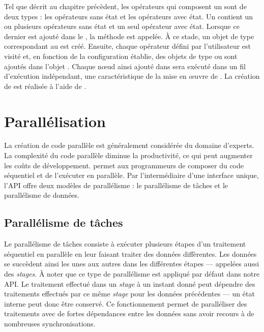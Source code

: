 Tel que d\'ecrit au chapitre pr\'ec\`edent, les op\'erateurs qui composent un  sont de deux types : les op\'erateurs sans \'etat et les op\'erateurs avec \'etat. Un  contient un ou plusieurs op\'erateurs sans \'etat et un seul op\'erateur avec \'etat. Lorsque ce dernier est ajout\'e dans le , la m\'ethode  est appel\'ee. \`A ce stade, un objet de type  correspondant au  est cr\'e\'e. Ensuite, chaque op\'erateur d\'efini par l'utilisateur est visit\'e et, en fonction de la configuration \'etablie, des objets de type  ou  sont ajout\'es dans l'objet . Chaque nœud ainsi ajout\'e dans  sera ex\'ecut\'e dans un fil d'ex\'ecution ind\'ependant, une caract\'eristique de la mise en \oe{}uvre de .
La cr\'eation de  est r\'ealis\'ee \`a l'aide de .


\section{Parall\'elisation}

La cr\'eation de code parall\`ele est g\'en\'eralement consid\'er\'ee du domaine d'experts. La complexit\'e du code parall\`ele diminue la productivit\'e, ce qui peut augmenter les co\^uts de d\'eveloppement.  permet aux programmeurs de composer du code s\'equentiel et de l'ex\'ecuter en parall\`ele. Par l'interm\'ediaire d'une interface unique, l'API offre deux mod\`eles de parall\'elisme : le parall\'elisme de t\^aches et le parall\'elisme de donn\'ees.




\subsection{Parall\'elisme de t\^aches}

Le parall\'elisme de t\^aches consiste \`a ex\'ecuter plusieurs \'etapes d'un traitement s\'equentiel en parall\`ele en leur faisant traiter des données diff\`erentes. Les donn\'ees se succ\`edent ainsi les unes aux autres dans les diff\'erentes \'etapes --- appel\'ees  aussi des \emph{stages}. \`A noter que ce type de parall\'elisme est appliqu\'e par d\'efaut dans notre API. Le traitement effectu\'e dans un \emph{stage} \`a un instant donn\'e peut d\'ependre des traitements effectu\'es par ce m\^eme \emph{stage} pour les donn\'ees pr\'ec\'edentes --- un \'etat interne peut donc \^etre conserv\'e. Ce fonctionnement permet de parall\'eliser des traitements avec de fortes d\'ependances entre les donn\'ees sans avoir recours \`a de nombreuses synchronisations. 


